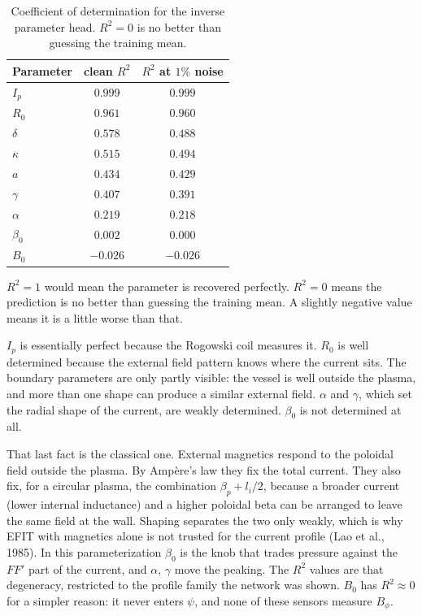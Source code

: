 \documentclass[11pt,a4paper,oneside,openany]{book}
\numberwithin{equation}{chapter}
\newcommand{\Ip}{I_{p}}
\theoremstyle{definition}
\begin{document}
\begin{table}[htbp]
\centering
\caption{Coefficient of determination for the inverse parameter head. \(R^{2}=0\) is no better than guessing the training mean.}
\label{tab:r2}
\small
\begin{tabular}{@{}lcc@{}}
\toprule
Parameter & clean \(R^{2}\) & \(R^{2}\) at \(1\%\) noise \\
\midrule
\(\Ip\) & \(0.999\) & \(0.999\) \\
\(R_{0}\) & \(0.961\) & \(0.960\) \\
\(\delta\) & \(0.578\) & \(0.488\) \\
\(\kappa\) & \(0.515\) & \(0.494\) \\
\(a\) & \(0.434\) & \(0.429\) \\
\(\gamma\) & \(0.407\) & \(0.391\) \\
\(\alpha\) & \(0.219\) & \(0.218\) \\
\(\beta_{0}\) & \(0.002\) & \(0.000\) \\
\(B_{0}\) & \(-0.026\) & \(-0.026\) \\
\bottomrule
\end{tabular}
\end{table}

\(R^{2}=1\) would mean the parameter is recovered perfectly. \(R^{2}=0\) means the prediction is no better than guessing the training mean. A slightly negative value means it is a little worse than that.

\(\Ip\) is essentially perfect because the Rogowski coil measures it. \(R_{0}\) is well determined because the external field pattern knows where the current sits. The boundary parameters are only partly visible: the vessel is well outside the plasma, and more than one shape can produce a similar external field. \(\alpha\) and \(\gamma\), which set the radial shape of the current, are weakly determined. \(\beta_{0}\) is not determined at all.

That last fact is the classical one. External magnetics respond to the poloidal field outside the plasma. By Amp\`ere's law they fix the total current. They also fix, for a circular plasma, the combination \(\beta_{p}+l_{i}/2\), because a broader current (lower internal inductance) and a higher poloidal beta can be arranged to leave the same field at the wall. Shaping separates the two only weakly, which is why EFIT with magnetics alone is not trusted for the current profile (Lao et al., 1985). In this parameterization \(\beta_{0}\) is the knob that trades pressure against the \(FF'\) part of the current, and \(\alpha\), \(\gamma\) move the peaking. The \(R^{2}\) values are that degeneracy, restricted to the profile family the network was shown. \(B_{0}\) has \(R^{2}\approx 0\) for a simpler reason: it never enters \(\psi\), and none of these sensors measure \(B_{\phi}\).
\end{document}
